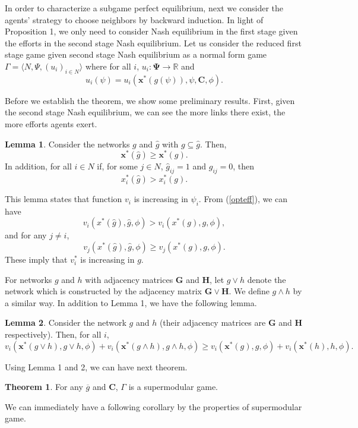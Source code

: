 \documentclass[12pt]{article}
\theoremstyle{definition}
\newtheorem{theorem}{Theorem}
\newtheorem{lemma}{Lemma}
\newcommand{\bm}[1]{\boldsymbol{#1}}
\begin{document}
In order to characterize a subgame perfect equilibrium, next we consider the agents' strategy to choose neighbors by backward induction.
In light of Proposition 1, we only need to consider Nash equilibrium in the first stage given the efforts in the second stage Nash equilibrium.
Let us consider the reduced first stage game given second stage Nash equilibrium as a normal form game $\Gamma = \langle N, \Psi, {(u_i)}_{i \in N} \rangle$ where for all $i$, $u_i : \bm{\Psi} \rightarrow \mathbb{R}$ and
\[ u_i(\psi) = u_i(\bm{x}^*(g(\psi)), \psi, \bm{C}, \phi). \]

Before we establish the theorem, we show some preliminary results.
First, given the second stage Nash equilibrium, we can see the more links there exist, the more efforts agents exert.

\begin{lemma}
	Consider the networks $g$ and $\hat{g}$ with $g \subseteq \hat{g}$.
	Then,
	\[ \bm{x}^*(\hat{g}) \ge \bm{x}^*(g). \]
	In addition, for all $i \in N$ if, for some $j \in N$, $\hat{g}_{ij} = 1$ and $g_{ij} = 0$, then
	\[ x_i^*(\hat{g}) > x_i^*(g). \]
\end{lemma}

This lemma states that function $v_i$ is increasing in $\psi_i$.
From (\ref{opteff}), we can have 
\[ v_i(x^*(\hat{g}), \hat{g}, \phi) > v_i(x^*(g), g, \phi),\]
and for any $j \neq i$,
\[ v_j(x^*(\hat{g}), \hat{g}, \phi) \ge v_j(x^*(g), g, \phi).\]
These imply that $v_i^*$ is increasing in $g$.

For networks $g$ and $h$ with adjacency matrices $\bm{G}$ and $\bm{H}$, let $g \vee h$ denote the network which is constructed by the adjacency matrix $\bm{G} \vee \bm{H}$.
We define $g \wedge h$ by a similar way.
In addition to Lemma 1, we have the following lemma.

\begin{lemma}
	Consider the network $g$ and $h$ (their adjacency matrices are $\bm{G}$ and $\bm{H}$ respectively).
	Then, for all $i$,
	\[ v_i(\bm{x}^*(g \vee h), g \vee h, \phi) + v_i(\bm{x}^*(g \wedge h), g \wedge h, \phi) \ge v_i(\bm{x}^*(g), g, \phi) + v_i(\bm{x}^*(h), h, \phi).\]
\end{lemma}
Using Lemma 1 and 2, we can have next theorem.

\begin{theorem}
	For any $\overline{g}$ and $\bm{C}$, $\Gamma$ is a supermodular game.
\end{theorem}

We can immediately have a following corollary by the properties of supermodular game.
\end{document}
